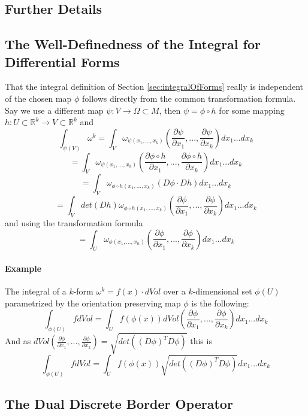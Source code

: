 \begin{appendix}
\chapter{Further Details}
\section{The Well-Definedness of the Integral for Differential Forms}
\label{app:integrals}

That the integral definition of Section \ref{sec:integralOfForms} really is independent of the chosen map $\phi$ follows directly from the common transformation formula. Say we use a different map $\psi: V \rightarrow \Omega \subset M$, then $\psi = \phi \circ h$ for some mapping $h:U \subset \mathbb R^k \rightarrow V \subset \mathbb R^k$ and 
\[\int_{\psi(V)} \omega^k = \int_V \omega_{\psi(x_1,...,x_k)}(\frac{\partial \psi}{\partial x_1},...,\frac{\partial \psi}{\partial x_k}) d x_1...d x_k\]
\[= \int_V \omega_{\psi(x_1,...,x_k)}(\frac{\partial \phi \circ h}{\partial x_1},...,\frac{\partial \phi \circ h}{\partial x_k}) d x_1...d x_k\]
\[= \int_V \omega_{\phi\circ h(x_1,...,x_k)}(D\phi \cdot Dh) d x_1...d x_k\]
\[= \int_{V} det(Dh) \omega_{\phi\circ h(x_1,...,x_k)}(\frac{\partial \phi}{\partial x_1},...,\frac{\partial \phi}{\partial x_k}) d x_1...d x_k\]
and using the transformation formula
\[= \int_U \omega_{\phi(x_1,...,x_n)} (\frac{\partial \phi}{\partial x_1},...,\frac{\partial \phi}{\partial x_k}) d x_1...d x_k \]

\subsubsection{Example}
The integral of a $k$-form $\omega^k = f(x) \cdot dVol $ over a $k$-dimensional set $\phi(U)$ parametrized by the orientation preserving map $\phi$ is the following:
\[\int_{\phi(U)} f dVol = \int_{U} f(\phi(x)) dVol(\frac{\partial \phi}{\partial x_1},...,\frac{\partial \phi}{\partial x_k})dx_1...dx_k\]
And as $dVol(\frac{\partial \phi}{\partial x_1},...,\frac{\partial \phi}{\partial x_k}) = \sqrt{det((D\phi)^TD\phi)}$ this is
\[\int_{\phi(U)} f dVol = \int_{U} f(\phi(x)) \sqrt{det((D\phi)^TD\phi)} dx_1...dx_k\]



\section{The Dual Discrete Border Operator}


\end{appendix}
